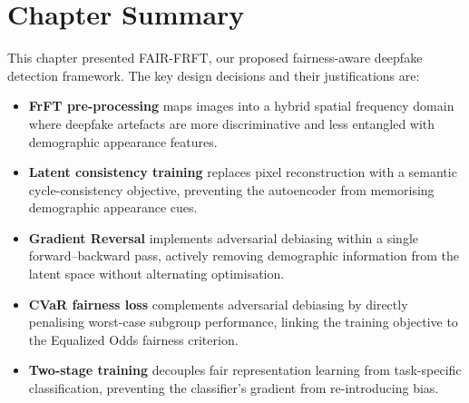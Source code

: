  
\section{Chapter Summary}
\label{sec:ch5_summary}
 
This chapter presented FAIR-FRFT, our proposed fairness-aware
deepfake detection framework.  The key design decisions and their
justifications are:
 
\begin{itemize}
  \item \textbf{FrFT pre-processing} maps images into a hybrid spatial frequency domain where deepfake artefacts are more discriminative and less entangled with demographic
        appearance features.
  \item \textbf{Latent consistency training} replaces pixel reconstruction with a semantic cycle-consistency objective, preventing the autoencoder from memorising demographic appearance cues.
  \item \textbf{Gradient Reversal} implements adversarial debiasing within a single forward--backward pass, actively removing demographic information from the latent space without alternating optimisation. 
  \item \textbf{CVaR fairness loss} complements adversarial 
        debiasing by directly penalising worst-case subgroup  performance, linking the training objective to the Equalized Odds fairness criterion.
  \item \textbf{Two-stage training} decouples fair
        representation learning from task-specific
        classification, preventing the classifier's gradient
        from re-introducing bias.
\end{itemize}
